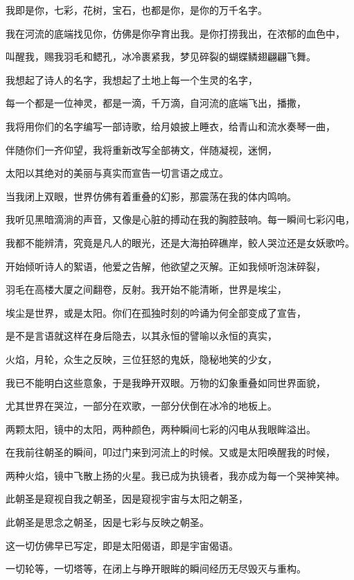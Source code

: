 \documentclass[UTF8]{article}
\begin{document}
\par 我即是你，七彩，花树，宝石，也都是你，是你的万千名字。
\par 我在河流的底端找见你，仿佛是你孕育出我。是你打捞我出，在浓郁的血色中，
\par 叫醒我，赐我羽毛和鳃孔，冰冷裹紧我，梦见碎裂的蝴蝶鳞翅翩翩飞舞。
\par 我想起了诗人的名字，我想起了土地上每一个生灵的名字，
\par 每一个都是一位神灵，都是一滴，千万滴，自河流的底端飞出，播撒，
\par 我将用你们的名字编写一部诗歌，给月娘披上睡衣，给青山和流水奏琴一曲，
\par 伴随你们一齐仰望，我将重新改写全部祷文，伴随凝视，迷惘，
\par 太阳以其绝对的美丽与真实而宣告一切言语之成立。
\\[0.6cm]
\par 当我闭上双眼，世界仿佛有着重叠的幻影，那震荡在我的体内鸣响。
\par 我听见黑暗滴淌的声音，又像是心脏的搏动在我的胸腔鼓响。每一瞬间七彩闪电，
\par 我都不能辨清，究竟是凡人的眼光，还是大海拍碎礁岸，鲛人哭泣还是女妖歌吟。
\par 开始倾听诗人的絮语，他爱之告解，他欲望之灭解。正如我倾听泡沫碎裂，
\par 羽毛在高楼大厦之间翻卷，反射。我开始不能清晰，世界是埃尘，
\par 埃尘是世界，或是太阳。你们在孤独时刻的吟诵为何全部变成了宣告，
\par 是不是言语就这样在身后隐去，以其永恒的譬喻以永恒的真实，
\par 火焰，月轮，众生之反映，三位狂怒的鬼妖，隐秘地笑的少女，
\par 我已不能明白这些意象，于是我睁开双眼。万物的幻象重叠如同世界面貌，
\par 尤其世界在哭泣，一部分在欢歌，一部分伏倒在冰冷的地板上。
\par 两颗太阳，镜中的太阳，两种颜色，两种瞬间七彩的闪电从我眼眸溢出。
\par 在我前往朝圣的瞬间，叩过门来到河流上的时候。又或是太阳唤醒我的时候，
\par 两种火焰，镜中飞散上扬的火星。我已成为执镜者，我亦成为每一个哭神笑神。
\par 此朝圣是窥视自我之朝圣，因是窥视宇宙与太阳之朝圣，
\par 此朝圣是思念之朝圣，因是七彩与反映之朝圣。
\par 这一切仿佛早已写定，即是太阳偈语，即是宇宙偈语。
\par 一切轮等，一切塔等，在闭上与睁开眼眸的瞬间经历无尽毁灭与重构。
\end{document}
